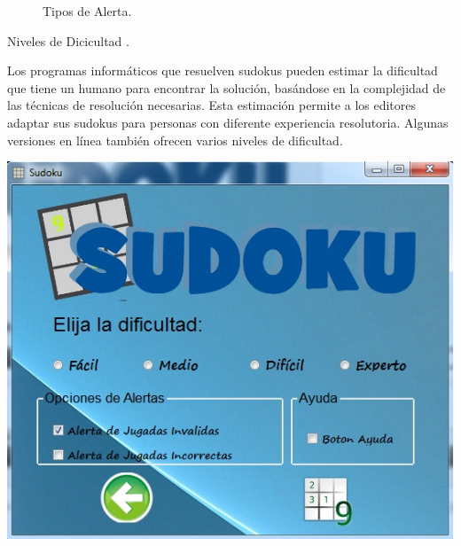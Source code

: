 \documentclass[10pt,oneside]{report}
\begin{document}
{\begin{figure}
{\begin{center}
\caption{Tipos de Alerta.}
\end{center}}
\end{figure}
\begin{bf} Niveles de Dicicultad .\end{bf}\newline Los programas informáticos que resuelven sudokus pueden estimar la dificultad que tiene un humano para encontrar la solución, basándose en la complejidad de las técnicas de resolución necesarias. Esta estimación permite a los editores adaptar sus sudokus para personas con diferente experiencia resolutoria. Algunas versiones en línea también ofrecen varios niveles de dificultad. \newline \begin{center} \includegraphics[width=.60\textwidth]{./imagenes/nuevoJuego.jpg} \end{center} \begin{figure}[h] \begin{center} 

\end{center}
\end{figure}}
\end{document}
